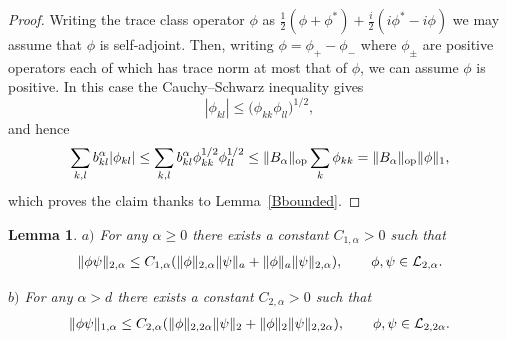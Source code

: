 \documentclass[10pt,a4paper]{amsart}
\newtheorem{lemma}{Lemma}
\begin{document}
\begin{proof}
Writing the trace class operator $\phi$ as $\frac
12(\phi+\phi^*)+\frac i2(i\phi^*-i\phi)$ we may assume that $\phi$ is
self-adjoint. Then, writing $\phi= \phi_+-\phi_-$ where $\phi_\pm$ are positive
operators each of which has trace norm at most that of $\phi$, we can
assume $\phi$ is positive. In this case the Cauchy--Schwarz inequality
gives
\[
|\phi_{kl}|  \leq \big(\phi_{kk} \phi_{ll}\big)^{1/2},
\]
and hence
\begin{gather*}
\sum_{k,l}b_{kl}^{\alpha} |\phi_{kl}|\leq
\sum_{k,l}b_{kl}^{\alpha} \phi_{kk}^{1/2} \phi_{ll}^{1/2}
\leq \Vert B_{\alpha}\Vert_{\rm op} \sum_k\phi_{kk}
=\Vert B_{\alpha}\Vert_{\rm op} \Vert\phi\Vert_1 ,
\end{gather*}
which proves the claim thanks to Lemma~\ref{Bbounded}.
\end{proof}

\begin{lemma}\label{product}
$a)$  For any $\alpha\geq 0$ there exists a constant $C_{1,\alpha}>0$
such that
\begin{gather}\label{prodest1}
\Vert\phi \psi\Vert_{2,\alpha}\leq C_{1,\alpha}(\Vert\phi\Vert_{2,\alpha} \Vert\psi\Vert_a
+\Vert\phi\Vert_a \Vert\psi\Vert_{2,\alpha}),\qquad \phi, \psi\in {\cal L}_{2,\alpha} .
\end{gather}

$b)$  For any $\alpha> d$ there exists a constant $C_{2,\alpha}>0$
such that
\begin{gather}\label{prodest2}
\Vert\phi \psi\Vert_{1,\alpha}\leq C_{2,\alpha}(\Vert\phi\Vert_{2,2\alpha} \Vert\psi\Vert_2
+\Vert\phi\Vert_2 \Vert\psi\Vert_{2,2\alpha}),\qquad \phi,\psi\in {\cal L}_{2, 2\alpha} .
\end{gather}
\end{lemma}
\end{document}
